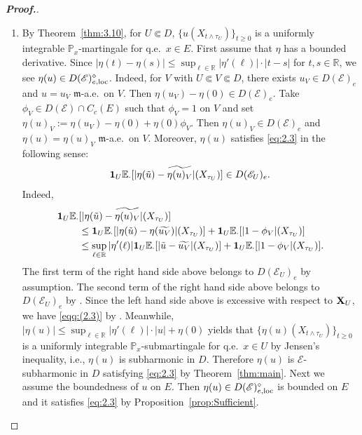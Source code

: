 \documentclass[12pt,a4paper]{article}
\newcommand{\R}{\mathbb{R}}
\newcommand{\m}{\mathfrak{m} }
\newcommand{\loc}{{\rm loc}}
\newcommand{\1}{{\bf 1}}
\newcommand{\wt}{\widetilde}
\renewcommand{\wt}{\widetilde}
\begin{document}
\begin{proof}[{\bf Proof.}]
\begin{enumerate}
\item[\rm(1)] By Theorem~\ref{thm:3.10}, for $U\Subset D$, $\{u(X_{t\land\tau_U})\}_{t\geq0}$ is a uniformly integrable $\mathbb{P}_x$-martingale for q.e.~$x\in E$. First assume that $\eta$ has a bounded derivative. 
Since $|\eta(t)-\eta(s)|\leq\sup_{\ell\in\R}|\eta'(\ell)|\cdot|t-s|$ for $t,s\in\R$, we see $\eta(u)\in D(\mathscr{E})_{e,\loc}^{\diamond}$. 
Indeed, for $V$ with $U\Subset V\Subset D$, there exists 
$u_V\in D(\mathscr{E})_e$ and $u=u_V$ ${\m}$-a.e.~on $V$. Then $\eta(u_V)-\eta(0)\in 
D(\mathscr{E})_e$. Take $\phi_V\in D(\mathscr{E})\cap C_c(E)$ such 
that $\phi_V=1$ on $V$ and set $\eta(u)_V:=\eta(u_V)-\eta(0)+\eta(0)\phi_V$. 
Then $\eta(u)_V\in D(\mathscr{E})_e$ and $\eta(u)=\eta(u)_V$ ${\m}$-a.e.~on $V$. Moreover, $\eta(u)$ satisfies \eqref{eq:2.3} in the following sense: 
\begin{align}
\1_U\mathbb{E}_{\cdot}[|\eta(\tilde{u})-\wt{\eta(u)_V}|(X_{\tau_U})]\in D(\mathscr{E}_U)_e.\label{eqq:(2.3)}
\end{align}
Indeed, 
\begin{align*}
\1_U\mathbb{E}_{\cdot}&[|\eta(\tilde{u})-\wt{\eta(u)_V}|(X_{\tau_U})]\\&\leq 
\1_U\mathbb{E}_{\cdot}[|\eta(\tilde{u})-\eta(\wt{u_V})|(X_{\tau_U})]+
\1_U\mathbb{E}_{\cdot}[|1-\phi_V|(X_{\tau_U})]\\
&\leq 
\sup_{\ell\in\R}|\eta'(\ell)|\1_U\mathbb{E}_{\cdot}[|\tilde{u}-\wt{u_V}|(X_{\tau_U})]+
\1_U\mathbb{E}_{\cdot}[|1-\phi_V|(X_{\tau_U})].
\end{align*}
The first term of the right hand side above belongs to $D(\mathscr{E}_U)_e$ 
by assumption. 
The second term of the right hand side above belongs to $D(\mathscr{E}_U)_e$ 
by \cite[Lemma~2.3]{Chen}. Since the left hand side above is excessive with respect to ${\bf X}_U$, we have \eqref{eqq:(2.3)} by \cite[Lemma~3.3]{CK}.   
Meanwhile, 
$|\eta(u)|\leq\sup_{\ell\in\R}|\eta'(\ell)|\cdot|u|+\eta(0)$ yields that 
$\{\eta(u)(X_{t\land\tau_U})\}_{t\geq0}$ is a uniformly 
integrable $\mathbb{P}_x$-submartingale for q.e.~$x\in U$ by Jensen's inequality, i.e., $\eta(u)$ is subharmonic in $D$. 
Therefore $\eta(u)$ is $\mathscr{E}$-subharmonic in $D$ satisfying 
\eqref{eq:2.3} by Theorem~\ref{thm:main}. 
Next we assume the boundedness of $u$ on $E$. Then $\eta(u)\in D(\mathscr{E})_{e,\loc}^{\diamond}$ is bounded on $E$ and it satisfies 
\eqref{eq:2.3} by Proposition~\ref{prop:Sufficient}. 

\end{enumerate}
\end{proof}
\end{document}
